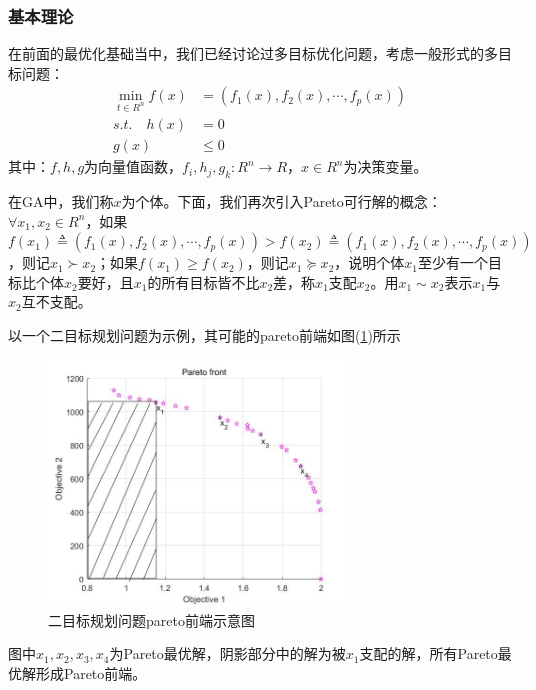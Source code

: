         \subsubsection{基本理论}
            \par
            在前面的最优化基础当中，我们已经讨论过多目标优化问题，考虑一般形式的多目标问题：
            \begin{align*}
            \mathop{\min}\limits_{t \in R^n}f(x)& =\left(f_1(x),f_2(x),\cdots,f_p(x)\right)\\
            s.t.\quad h(x)&=0\\
                     g(x)&\leqslant 0
            \end{align*}
            其中：$f,h,g$为向量值函数，$f_i,h_j,g_k:R^n\to R$，$x\in R^n$为决策变量。
            \par
            在GA中，我们称$x$为个体。下面，我们再次引入Pareto可行解的概念：$\forall x_1,x_2\in R^n$，如果$f(x_1)\triangleq \left(f_1(x),f_2(x),\cdots,f_p(x)\right)>f(x_2)\triangleq \left(f_1(x),f_2(x),\cdots,f_p(x)\right) $，则记$x_1\succ x_2$；如果$f(x_1)\geqslant f(x_2)$，则记$x_1\succeq  x_2$，说明个体$x_1$至少有一个目标比个体$x_2$要好，且$x_1$的所有目标皆不比$x_2$差，称$x_1$支配$x_2$。用$x_1 \sim x_2$表示$x_1$与$x_2$互不支配。
            \par
            以一个二目标规划问题为示例，其可能的pareto前端如图(\ref{二目标规划问题pareto前端示意图})所示
            \begin{figure}[H]
            \centering
            \includegraphics[width = 8cm]{images/pareto_qiandan_exapmle.jpg}
            \caption{二目标规划问题pareto前端示意图}
            \label{二目标规划问题pareto前端示意图}
            \end{figure}
            \par
            图中$x_1,x_2,x_3,x_4$为Pareto最优解，阴影部分中的解为被$x_1$支配的解，所有Pareto最优解形成Pareto前端。
